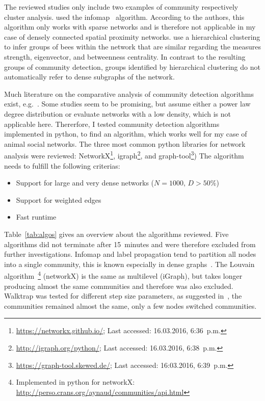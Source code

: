 The reviewed studies only include two examples of community respectively cluster analysis. \textcite{mersch2013tracking} used the infomap~\cite{rosvall2009map,rosvall2007information} algorithm. According to the authors, this algorithm only works with sparse networks and is therefore not applicable in my case of densely connected spatial proximity networks. \textcite{baracchi2014socio} use a hierarchical clustering to infer groups of bees within the network that are similar regarding the measures strength, eigenvector, and betweenness centrality. In contrast to the resulting groups of community detection, groups identified by hierarchical clustering do not automatically refer to dense subgraphs of the network.

Much literature on the comparative analysis of community detection algorithms exist, e.g.~\cite{yang2016comparative, harenberg2014community}. Some studies seem to be promising, but assume either a power law degree distribution or
evaluate networks with a low density, which is not applicable here.
Thererfore, I tested community detection algorithms implemented in python, to find an algorithm, which works well for my case of animal social networks. The three most common python libraries for network analysis were reviewed: NetworkX\footnote{\url{https://networkx.github.io/}; Last accessed: 16.03.2016, 6:36~p.m.}, igraph\footnote{\url{http://igraph.org/python/}; Last accessed: 16.03.2016, 6:38~p.m.}, and graph-tool\footnote{\url{https://graph-tool.skewed.de/}; Last accessed: 16:03.2016, 6:39~p.m.})
The algorithm needs to fulfill the following criterias:

\begin{itemize}
\item Support for large and very dense networks ($N=1000$, $D>50\%$)
\item Support for weighted edges
\item Fast runtime
\end{itemize}

Table~\ref{tab:algos} gives an overview about the algorithms reviewed. Five algorithms did not terminate after 15~minutes and were therefore excluded from further investigations. Infomap and label propagation tend to partition all nodes into a single community, this is known especially in dense graphs~\cite{yang2016comparative, fortunato2010community}.
The Louvain algorithm~\footnote{Implemented in python for networkX: \url{http://perso.crans.org/aynaud/communities/api.html}} (networkX) is the same as multilevel (iGraph), but takes longer producing almost the same communities and therefore was also excluded. Walktrap was tested for different step size parameters, as suggested in~\cite{pons2005computing}, the communities remained almost the same, only a few nodes switched communities.

